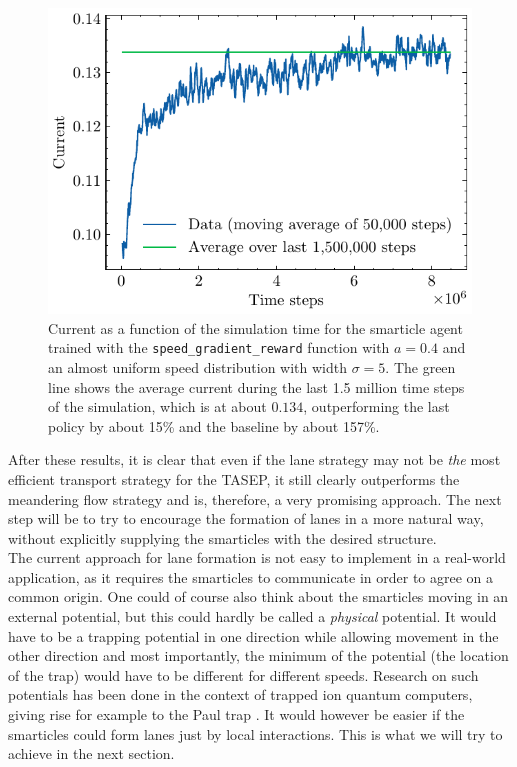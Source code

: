 \begin{figure}[H]
    \centering
    \includegraphics{speed_grad_current.pdf}
    \caption{Current as a function of the simulation time for the smarticle agent trained with the \texttt{speed\_gradient\_reward} function with $a=0.4$ and an almost uniform speed distribution with width $\sigma=5$. The green line shows the average current during the last 1.5 million time steps of the simulation, which is at about $0.134$, outperforming the last policy by about 15\% and the baseline by about 157\%.}
    \label{fig:speed_grad_current}
\end{figure}

After these results, it is clear that even if the lane strategy may not be \textit{the} most efficient transport strategy for the TASEP, it still clearly outperforms the meandering flow strategy and is, therefore, a very promising approach. The next step will be to try to encourage the formation of lanes in a more natural way, without explicitly supplying the smarticles with the desired structure.
\\
The current approach for lane formation is not easy to implement in a real-world application, as it requires the smarticles to communicate in order to agree on a common origin. One could of course also think about the smarticles moving in an external potential, but this could hardly be called a \textit{physical} potential. It would have to be a trapping potential in one direction while allowing movement in the other direction and most importantly, the minimum of the potential (the location of the trap) would have to be different for different speeds. Research on such potentials has been done in the context of trapped ion quantum computers, giving rise for example to the Paul trap \cite[II.A]{bruzewicz_trapped-ion_2019}. It would however be easier if the smarticles could form lanes just by local interactions. This is what we will try to achieve in the next section.

